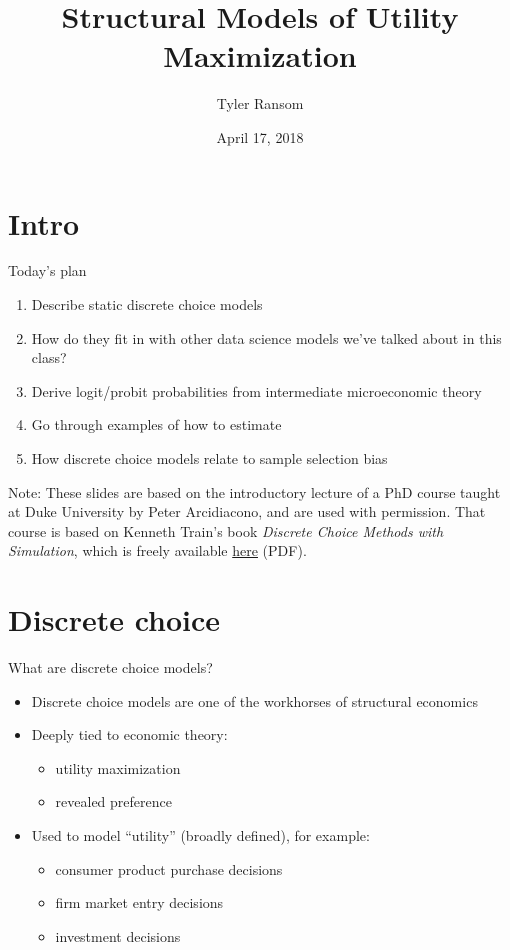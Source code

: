 \documentclass[english,aspectratio=169,12pt,xcolor=dvipsnames]{beamer}
\title{Structural Models of Utility Maximization}
\author{Tyler Ransom}
\institute[OU Econ]{\normalsize{University of Oklahoma, Dept. of Economics}}
\date{April 17, 2018}
\begin{document}
{
\frame[noframenumbering]{\titlepage}
}




\section{Intro}
\begin{frame}{Today's plan}
\begin{enumerate}
\item Describe static discrete choice models
\item How do they fit in with other data science models we've talked about in this class?
\item Derive logit/probit probabilities from intermediate microeconomic theory
\item Go through examples of how to estimate
\item How discrete choice models relate to sample selection bias
\end{enumerate}

\bigskip{}
\bigskip{}

\footnotesize{Note: These slides are based on the introductory lecture of a PhD course taught at Duke University by Peter Arcidiacono, and are used with permission. That course is based on Kenneth Train's book \emph{Discrete Choice Methods with Simulation}, which is freely available \href{https://eml.berkeley.edu/books/train1201.pdf}{here} (PDF).}
\end{frame}



\section{Discrete choice}
\begin{frame}{What are discrete choice models?}
\begin{itemize}
\item Discrete choice models are one of the workhorses of structural economics
\item Deeply tied to economic theory:
    \begin{itemize}
    \item utility maximization
    \item revealed preference
    \end{itemize}
\item Used to model ``utility'' (broadly defined), for example:
    \begin{itemize}
    \item consumer product purchase decisions
    \item firm market entry decisions
    \item investment decisions
    \end{itemize}
\end{itemize}
\end{frame}
\end{document}

